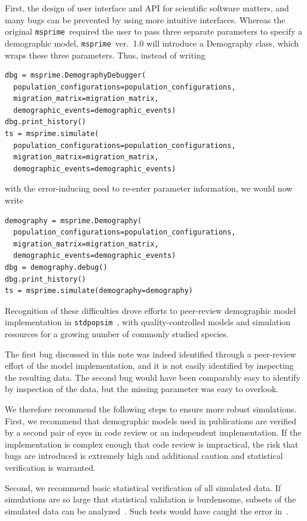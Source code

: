 \documentclass{article}
\newcommand{\msprime}[0]{\texttt{msprime}}
\newcommand{\stdpopsim}[0]{\texttt{stdpopsim}}
\begin{document}
First, the design of user interface and API for scientific software matters,
and many bugs can be prevented by using more intuitive interfaces.
Whereas the original \msprime\ required the user to pass
three separate parameters to specify a demographic model, \msprime~ver.~1.0
will introduce a Demography class, which wraps these three parameters.
Thus, instead of writing
\begin{lstlisting}[frame=single]
dbg = msprime.DemographyDebugger(
  population_configurations=population_configurations,
  migration_matrix=migration_matrix,
  demographic_events=demographic_events)
dbg.print_history()
ts = msprime.simulate(
  population_configurations=population_configurations,
  migration_matrix=migration_matrix,
  demographic_events=demographic_events)
\end{lstlisting}
with the error-inducing need to re-enter parameter information,
we would now write
\begin{lstlisting}[frame=single]
demography = msprime.Demography(
  population_configurations=population_configurations,
  migration_matrix=migration_matrix,
  demographic_events=demographic_events)
dbg = demography.debug()
dbg.print_history()
ts = msprime.simulate(demography=demography)
\end{lstlisting}



Recognition of these difficulties drove efforts to peer-review demographic model
implementation in \stdpopsim~\citep{adrion2019community}, with quality-controlled
models and simulation resources for a growing number of commonly studied species.



The first bug discussed in this note was indeed identified through a peer-review effort of the
model implementation, and it is not easily identified by inspecting the resulting data.
The second bug would have been comparably easy to identify by inspection
of the data, but the missing parameter was easy to overlook.

We therefore recommend the following steps to ensure more robust simulations.
First, we recommend that demographic models used in publications
are verified by a second pair of eyes in code review or an independent implementation.
If the implementation is complex enough that code review is impractical, the risk
that bugs are introduced is extremely high and additional caution and statistical
verification is warranted.

Second, we recommend basic statistical verification of all simulated data.
If simulations are so large that statistical validation is burdensome,
subsets of the simulated data can be analyzed~\citep{ralph2020efficiently}.
Such tests would have caught the error in~\citet{martin2017human}.
\end{document}
